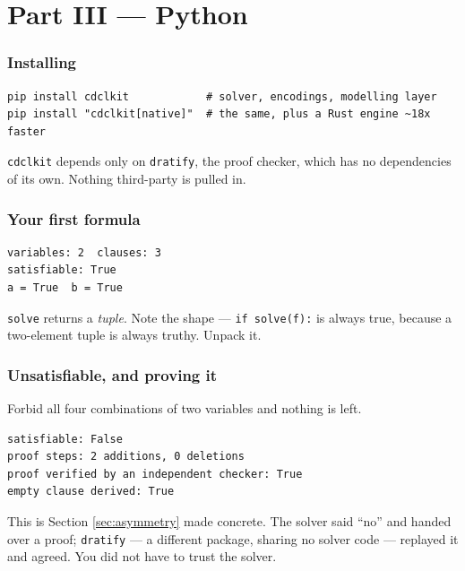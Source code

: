 \documentclass[11pt,a4paper]{article}
\newcommand{\pkg}[1]{\texttt{#1}}
\begin{document}
\newpage
\part*{Part III --- Python}

\section{Installing}

\begin{lstlisting}[style=base]
pip install cdclkit            # solver, encodings, modelling layer
pip install "cdclkit[native]"  # the same, plus a Rust engine ~18x faster
\end{lstlisting}

\pkg{cdclkit} depends only on \pkg{dratify}, the proof checker, which has no
dependencies of its own. Nothing third-party is pulled in.

\section{Your first formula}



\begin{lstlisting}[style=out]
variables: 2  clauses: 3
satisfiable: True
a = True  b = True
\end{lstlisting}

\texttt{solve} returns a \emph{tuple}. Note the shape --- \texttt{if
solve(f):} is always true, because a two-element tuple is always truthy.
Unpack it.

\section{Unsatisfiable, and proving it}

Forbid all four combinations of two variables and nothing is left.



\begin{lstlisting}[style=out]
satisfiable: False
proof steps: 2 additions, 0 deletions
proof verified by an independent checker: True
empty clause derived: True
\end{lstlisting}

This is Section \ref{sec:asymmetry} made concrete. The solver said ``no'' and
handed over a proof; \pkg{dratify} --- a different package, sharing no solver
code --- replayed it and agreed. You did not have to trust the solver.
\end{document}
